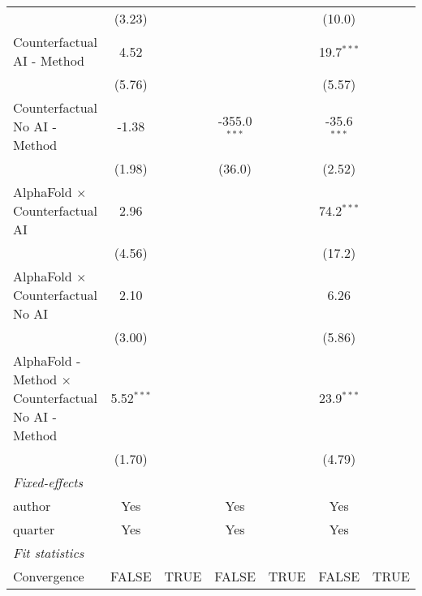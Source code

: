 \begin{tabular}{lcccccc}
                                                              & (3.23)        &      &                &      & (10.0)        &   \\   
   Counterfactual AI - Method                                 & 4.52          &      &                &      & 19.7$^{***}$  &   \\   
                                                              & (5.76)        &      &                &      & (5.57)        &   \\   
   Counterfactual No AI - Method                              & -1.38         &      & -355.0$^{***}$ &      & -35.6$^{***}$ &   \\   
                                                              & (1.98)        &      & (36.0)         &      & (2.52)        &   \\   
   AlphaFold $\times$ Counterfactual AI                       & 2.96          &      &                &      & 74.2$^{***}$  &   \\   
                                                              & (4.56)        &      &                &      & (17.2)        &   \\   
   AlphaFold $\times$ Counterfactual No AI                    & 2.10          &      &                &      & 6.26          &   \\   
                                                              & (3.00)        &      &                &      & (5.86)        &   \\   
   AlphaFold - Method $\times$ Counterfactual No AI - Method  & 5.52$^{***}$  &      &                &      & 23.9$^{***}$  &   \\   
                                                              & (1.70)        &      &                &      & (4.79)        &   \\   
   \midrule
   \emph{Fixed-effects}\\
   author                                                     & Yes           &      & Yes            &      & Yes           & \\  
   quarter                                                    & Yes           &      & Yes            &      & Yes           & \\  
   \midrule
   \emph{Fit statistics}\\
   Convergence                                                &FALSE          & TRUE & FALSE          & TRUE & FALSE         & TRUE\\  

\end{tabular}
